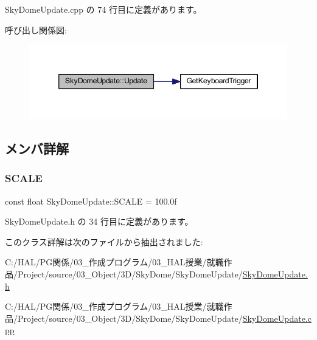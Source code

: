 Sky\+Dome\+Update.\+cpp の 74 行目に定義があります。

呼び出し関係図\+:\nopagebreak
\begin{figure}[H]
\begin{center}
\leavevmode
\includegraphics[width=346pt]{class_sky_dome_update_ae163cb90e4de561fe1f7b2cb311be331_cgraph}
\end{center}
\end{figure}


\subsection{メンバ詳解}
\mbox{\label{class_sky_dome_update_a4c6750a54880db753cfe2a4ecfd24130}} 
\subsubsection{\texorpdfstring{S\+C\+A\+LE}{SCALE}}
{\footnotesize\ttfamily const float Sky\+Dome\+Update\+::\+S\+C\+A\+LE = 100.\+0f\hspace{0.3cm}{\ttfamily [static]}}



 Sky\+Dome\+Update.\+h の 34 行目に定義があります。



このクラス詳解は次のファイルから抽出されました\+:\begin{DoxyCompactItemize}
\item 
C\+:/\+H\+A\+L/\+P\+G関係/03\+\_\+作成プログラム/03\+\_\+\+H\+A\+L授業/就職作品/\+Project/source/03\+\_\+\+Object/3\+D/\+Sky\+Dome/\+Sky\+Dome\+Update/\mbox{\hyperlink{_sky_dome_update_8h}{Sky\+Dome\+Update.\+h}}\item 
C\+:/\+H\+A\+L/\+P\+G関係/03\+\_\+作成プログラム/03\+\_\+\+H\+A\+L授業/就職作品/\+Project/source/03\+\_\+\+Object/3\+D/\+Sky\+Dome/\+Sky\+Dome\+Update/\mbox{\hyperlink{_sky_dome_update_8cpp}{Sky\+Dome\+Update.\+cpp}}\end{DoxyCompactItemize}
